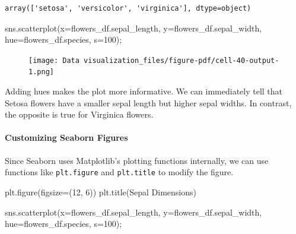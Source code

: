\documentclass[
  letterpaper,
  DIV=11,
  numbers=noendperiod]{scrreprt}
\let\oldparagraph\paragraph
\renewcommand{\paragraph}[1]{\oldparagraph{#1}\mbox{}}
\newenvironment{Shaded}{\begin{snugshade}}{\end{snugshade}}
\newcommand{\DecValTok}[1]{\textcolor[rgb]{0.68,0.00,0.00}{#1}}
\newcommand{\NormalTok}[1]{\textcolor[rgb]{0.00,0.23,0.31}{#1}}
\newcommand{\OperatorTok}[1]{\textcolor[rgb]{0.37,0.37,0.37}{#1}}
\newcommand{\StringTok}[1]{\textcolor[rgb]{0.13,0.47,0.30}{#1}}
\begin{document}
\begin{verbatim}
array(['setosa', 'versicolor', 'virginica'], dtype=object)
\end{verbatim}

\begin{Shaded}
\begin{Highlighting}[]
\NormalTok{sns.scatterplot(x}\OperatorTok{=}\NormalTok{flowers\_df.sepal\_length, y}\OperatorTok{=}\NormalTok{flowers\_df.sepal\_width, hue}\OperatorTok{=}\NormalTok{flowers\_df.species, s}\OperatorTok{=}\DecValTok{100}\NormalTok{)}\OperatorTok{;}
\end{Highlighting}
\end{Shaded}

\begin{figure}[H]

{\centering \texttt{[image: Data visualization\_files/figure-pdf/cell-40-output-1.png]}

}

\end{figure}

Adding hues makes the plot more informative. We can immediately tell
that Setosa flowers have a smaller sepal length but higher sepal widths.
In contrast, the opposite is true for Virginica flowers.

\hypertarget{customizing-seaborn-figures}{%
\paragraph{Customizing Seaborn
Figures}\label{customizing-seaborn-figures}}

Since Seaborn uses Matplotlib's plotting functions internally, we can
use functions like \texttt{plt.figure} and \texttt{plt.title} to modify
the figure.

\begin{Shaded}
\begin{Highlighting}[]
\NormalTok{plt.figure(figsize}\OperatorTok{=}\NormalTok{(}\DecValTok{12}\NormalTok{, }\DecValTok{6}\NormalTok{))}
\NormalTok{plt.title(}\StringTok{\textquotesingle{}Sepal Dimensions\textquotesingle{}}\NormalTok{)}

\NormalTok{sns.scatterplot(x}\OperatorTok{=}\NormalTok{flowers\_df.sepal\_length, }
\NormalTok{                y}\OperatorTok{=}\NormalTok{flowers\_df.sepal\_width, }
\NormalTok{                hue}\OperatorTok{=}\NormalTok{flowers\_df.species,}
\NormalTok{                s}\OperatorTok{=}\DecValTok{100}\NormalTok{)}\OperatorTok{;}
\end{Highlighting}
\end{Shaded}
\end{document}

